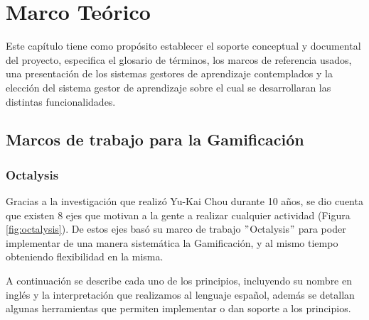 \chapter{Marco Teórico}
\label{ch:marcoTeorico}

Este capítulo tiene como propósito establecer el soporte conceptual y documental del proyecto, especifica el glosario de términos, los marcos de referencia usados, una presentación de los sistemas gestores de aprendizaje contemplados y la elección del sistema gestor de aprendizaje sobre el cual se desarrollaran las distintas funcionalidades.

\section{Marcos de trabajo para la Gamificación}
\subsection{Octalysis}
\label{sec:octalysis}

    Gracias a la investigación que realizó Yu-Kai Chou durante 10 años, se dio cuenta que existen 8 ejes que motivan a la gente a realizar cualquier actividad (Figura \ref{fig:octalysis}). De estos ejes basó su marco de trabajo $"$Octalysis$"$ para poder implementar de una manera sistemática la Gamificación, y al mismo tiempo obteniendo flexibilidad en la misma.
    
    
\begin{comment}
\begin{enumerate}
    \item \principioI
    \item \principioII
    \item \principioIII
    \item \principioIV
    \item \principioV
    \item \principioVI
    \item \principioVII
    \item \principioVIII
\end{enumerate}
\end{comment}
    
    \noindent A continuación se describe cada uno de los principios, incluyendo su nombre en inglés y la interpretación que realizamos al lenguaje español, además se detallan algunas herramientas que permiten implementar o dan soporte a los principios.
    
